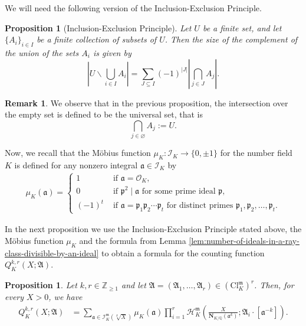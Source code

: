 \documentclass[11pt, reqno]{amsart}
\numberwithin{equation}{section}
\newtheorem{proposition}[theorem]{Proposition}
\newcommand{\Z}{\mathbb{Z}}
\newcommand{\Q}{\mathbb{Q}}
\newcommand{\Nrm}[2]{\mathbf{N}_{#1}(#2)}
\theoremstyle{definition}
\newtheorem{remark}[theorem]{Remark}
\begin{document}
We will need the following version of the Inclusion-Exclusion Principle.

\begin{proposition}[Inclusion-Exclusion Principle]\label{prop:inclusion-exclusion}
Let \( U \) be a finite set, and let \( \{ A_i \}_{i \in I} \) be a finite collection of subsets of \( U \).
Then the size of the complement of the union of the sets \( A_i \) is given by
\[
\left| U \smallsetminus \bigcup_{i \in I} A_i \right| 
= \sum_{J \subseteq I} (-1)^{|J|} \left| \bigcap_{j \in J} A_j \right|.
\]
\end{proposition}

\begin{remark}
We observe that in the previous proposition, the intersection over the empty set is defined to be the universal set, that is
\[
\bigcap_{j \in \varnothing} A_j := U.
\]
\end{remark}


Now, we recall that the Möbius function $\mu_K \colon \mathcal{I}_K \longrightarrow \{ 0, \pm 1 \}$ for the number field $K$ is defined for any nonzero integral $\mathfrak{a} \in \mathcal{I}_K$ by
\begin{align*}
\mu_K(\mathfrak{a}) = 
\begin{cases}1 & \text { if } \mathfrak{a} = \mathcal{O}_K, \\ 0 & \text { if } \mathfrak{p}^2 \mid \mathfrak{a} \text { for some prime ideal } \mathfrak{p}, \\ (-1)^t & \text{ if } \mathfrak{a} = \mathfrak{p}_1 \mathfrak{p}_2 \cdots \mathfrak{p}_t \text { for distinct primes } \mathfrak{p}_1, \mathfrak{p}_2, \ldots, \mathfrak{p}_t.
\end{cases}
\end{align*}

In the next proposition we use the Inclusion-Exclusion Principle stated above, the Möbius function $\mu_K$ and the formula from Lemma \ref{lem:number-of-ideals-in-a-ray-class-divisible-by-an-ideal} to obtain a formula for the counting function $Q_K^{k, r}(X; \mathfrak{A})$.

\begin{proposition}\label{prop:Q-identity-with-moebius}
Let $k,r\in\Z_{\geq 1}$ and let $\boldsymbol{\mathfrak{A}} = (\mathfrak{A}_1,\dots,\mathfrak{A}_r) \in \left(\mathrm{Cl}_K^{\mathfrak{m}}\right)^r$.
Then, for every $X>0$, we have
\begin{align*}
Q_K^{k,r}(X;\boldsymbol{\mathfrak{A}})
&=
\sum_{\mathfrak{a}\in
\mathcal{I}_K^{\mathfrak{m}}(\sqrt[k]{X})}
\mu_K(\mathfrak{a})
\prod_{i=1}^{r}
\mathcal{H}_K^{\mathfrak{m}}
\left(
\frac{X}{\Nrm{K/\Q}{\mathfrak{a}^k}};
\mathfrak{A}_i\cdot[\mathfrak{a}^{-k}]
\right).
\end{align*}
\end{proposition}
\end{document}
